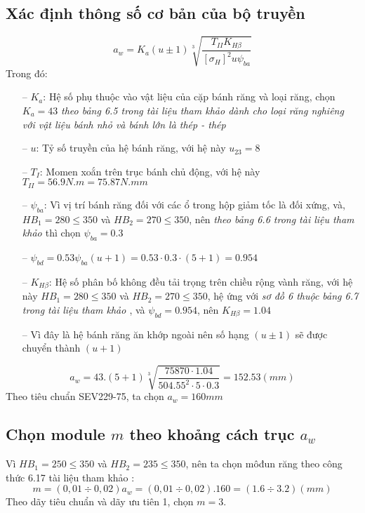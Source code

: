         \subsection{Xác định thông số cơ bản của bộ truyền}
            \begin{equation}
                a_w = K_a(u \pm 1)\sqrt[3]{\frac{T_{II}K_{H\beta}}{[\sigma_H]^2u\psi_{ba}}}
                \label{eq:3.10}
            \end{equation}
            \hspace*{0.6cm}Trong đó:
            \begin{itemize}
                \item[--] $K_a$: Hệ số phụ thuộc vào vật liệu của cặp bánh răng và loại răng, chọn $K_a = 43$ \textit{theo bảng 6.5 trong tài liệu tham khảo \cite{tltk1} dành cho loại răng nghiêng với vật liệu bánh nhỏ và bánh lớn là thép - thép}
                \item[--] $u$: Tỷ số truyền của hệ bánh răng, với hệ này $u_{23} = 8$
                \item[--] $T_I$: Momen xoắn trên trục bánh chủ động, với hệ này $T_{II} = 56.9 N.m = 75.87 N.mm$
                \item[--] $\psi_{ba}$: Vì vị trí bánh răng đối với các ổ trong hộp giảm tốc là đối xứng, và, $HB_1 = 280 \leq 350$ và $HB_2 = 270 \leq 350$, nên \textit{theo bảng 6.6 trong tài liệu tham khảo \cite{tltk1}} thì chọn $\psi_{ba} = 0.3$
                \item[--] $\psi_{bd} = 0.53\psi_{ba}(u + 1) = 0.53 \cdot 0.3 \cdot (5 + 1) = 0.954$ 
                \item[--] $K_{H\beta}$: Hệ số phân bố không đều tải trọng trên chiều rộng vành răng, với hệ này $HB_1 = 280 \leq 350$ và $HB_2 = 270 \leq 350$, hệ ứng với \textit{sơ đồ 6 thuộc bảng 6.7 trong tài liệu tham khảo \cite{tltk1}}, và $\psi_{bd} = 0.954$, nên $K_{H\beta} = 1.04$
                \item[--] Vì đây là hệ bánh răng ăn khớp ngoài nên số hạng $(u \pm 1)$ sẽ được chuyển thành $(u + 1)$ 
            \end{itemize}
            $$a_w = 43.(5 + 1)\sqrt[3]{\frac{75870 \cdot 1.04}{504.55 ^2 \cdot 5 \cdot 0.3}} = 152.53 (mm)$$
            \hspace*{0.6cm}Theo tiêu chuẩn SEV229-75, ta chọn $a_w = 160 mm$ 
        \subsection{Chọn module $m$ theo khoảng cách trục $a_w$}
            \hspace*{0.6cm}Vì $HB_1 = 250 \leq 350$ và $HB_2 = 235 \leq 350$, nên ta chọn môđun răng theo công thức 6.17 tài liệu tham khảo \cite{tltk1}:
            \begin{equation}
                m = (0,01 \div 0,02)a_w = (0,01 \div 0,02).160 = (1.6 \div 3.2) (mm)
                \label{eq:3.11}
            \end{equation}
            \hspace*{0.6cm}Theo dãy tiêu chuẩn và dãy ưu tiên 1, chọn $m = 3$.
